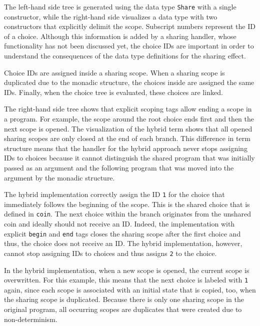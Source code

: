 \documentclass[a4paper, 11pt, fleqn, twoside, abstract=on]{scrreprt}
\newcommand{\hinl}[1]{\texttt{#1}}
\begin{document}
\vspace{0.32cm}

The left-hand side tree is generated using the data type \hinl{Share} with a single constructor, while the right-hand side visualizes a data type with two constructors that explicitly delimit the scope.
Subscript numbers represent the ID of a choice.
Although this information is added by a sharing handler, whose functionality has not been discussed yet, the choice IDs are important in order to understand the consequences of the data type definitions for the sharing effect.

Choice IDs are assigned inside a sharing scope.
When a sharing scope is duplicated due to the monadic structure, the choices inside are assigned the same IDs.
Finally, when the choice tree is evaluated, these choices are linked.

The right-hand side tree shows that explicit scoping tags allow ending a scope in a program.
For example, the scope around the root choice ends first and then the next scope is opened.
The visualization of the hybrid term shows that all opened sharing scopes are only closed at the end of each branch.
This difference in term structure means that the handler for the hybrid approach never stops assigning IDs to choices because it cannot distinguish the shared program that was initially passed as an argument and the following program that was moved into the argument by the monadic structure.

The hybrid implementation correctly assign the ID \hinl{1} for the choice that immediately follows the beginning of the scope.
This is the shared choice that is defined in \hinl{coin}.
The next choice within the branch originates from the unshared coin and ideally should not receive an ID.
Indeed, the implementation with explicit \hinl{begin} and \hinl{end} tags closes the sharing scope after the first choice and thus, the choice does not receive an ID.
The hybrid implementation, however, cannot stop assigning IDs to choices and thus assigns \hinl{2} to the choice.

In the hybrid implementation, when a new scope is opened, the current scope is overwritten.
For this example, this means that the next choice is labeled with \hinl{1} again, since each scope is associated with an initial state that is copied, too, when the sharing scope is duplicated.
Because there is only one sharing scope in the original program, all occurring scopes are duplicates that were created due to non-determinism.
\end{document}
